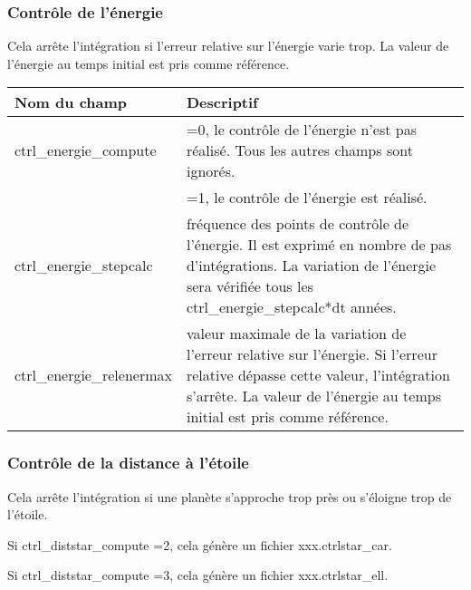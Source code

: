 \documentclass[11pt]{article}
\begin{document}
\vspace{0.5cm}
\subsubsection*{Contr\^ole de l'\'energie}
Cela arr\^ete l'int\'egration si l'erreur relative sur l'\'energie varie trop. La valeur de l'\'energie au temps initial est pris comme r\'ef\'erence.

\begin{tabularx}{\textwidth}{|l|X|}
\hline
Nom du champ& Descriptif \\ \hline \hline
ctrl\_energie\_compute & =0, le contr\^ole de l'\'energie n'est pas r\'ealis\'e. Tous les autres champs sont ignor\'es.\\
&=1, le contr\^ole de l'\'energie est r\'ealis\'e.\\  \hline
ctrl\_energie\_stepcalc & fr\'equence des points de  contr\^ole de l'\'energie. Il est exprim\'e en nombre de pas d'int\'egrations. La variation de l'\'energie sera v\'erifi\'ee tous les ctrl\_energie\_stepcalc*dt ann\'ees. \\ \hline
ctrl\_energie\_relenermax& valeur maximale de la variation de l'erreur relative sur l'\'energie. Si l'erreur relative d\'epasse cette valeur, l'int\'egration s'arr\^ete. La valeur de l'\'energie au temps initial est pris comme r\'ef\'erence.\\ \hline
 \end{tabularx}

\vspace{0.5cm}
\subsubsection*{Contr\^ole de la distance \`a l'\'etoile}
Cela arr\^ete l'int\'egration si une plan\`ete s'approche trop pr\`es ou s'\'eloigne trop de l'\'etoile. 

Si ctrl\_diststar\_compute =2, cela g\'en\`ere un fichier xxx.ctrlstar\_car.

Si ctrl\_diststar\_compute =3, cela g\'en\`ere un fichier xxx.ctrlstar\_ell. 
\end{document}
